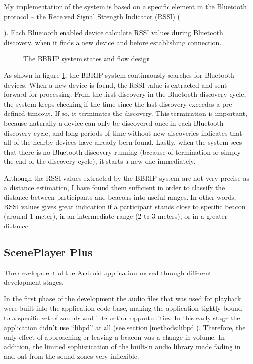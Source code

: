 \documentclass[a4paper,11pt]{article}
\begin{document}
My implementation of the system is based on a specific element in the Bluetooth protocol -- the Received Signal Strength Indicator (RSSI) ({\cite{bray12}).
Each Bluetooth enabled device calculate RSSI values during Bluetooth discovery, when it finds a new device and before establishing connection.

\begin{figure}[!htb]
	\centering
	\def\svgwidth{\columnwidth}
  	
	\caption{The BBRIP system states and flow design}\label{fig:bbrip}
\end{figure}

As shown in figure \ref{fig:bbrip}, the BBRIP system continuously searches for Bluetooth devices.
When a new device is found, the RSSI value is extracted and sent forward for processing.
From the first discovery in the Bluetooth discovery cycle, the system keeps checking if the time since the last discovery exceedes a pre-defined timeout.
If so, it terminates the discovery.
This termination is important, because naturally a device can only be discovered once in each Bluetooth discovery cycle, and long periods of time without new discoveries indicates that all of the nearby devices have already been found.
Lastly, when the system sees that there is no Bluetooth discovery running (because of termination or simply the end of the discovery cycle), it starts a new one immediately.

Although the RSSI values extracted by the BBRIP system are not very precise as a distance estimation, I have found them sufficient in order to classify the distance between participants and beacons into useful ranges.
In other words, RSSI values gives great indication if a participant stands close to specific beacon (around 1 meter), in an intermediate range (2 to 3 meters), or in a greater distance.

\subsection{ScenePlayer Plus}\label{sceneplayer_plus}

The development of the Android application moved through different development stages.

In the first phase of the development the audio files that was used for playback were built into the application code-base, making the application tightly bound to a specific set of sounds and interaction opportunities.
In this early stage the application didn't use ``libpd'' at all (see section \ref{methods:libpd}).
Therefore, the only effect of approaching or leaving a beacon was a change in volume.
In addition, the limited sophistication of the built-in audio library made fading in and out from the sound zones very inflexible.

}
\end{document}

